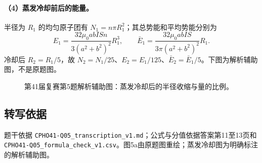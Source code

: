 \paragraph{（4）蒸发冷却前后的能量。}
半径为 $R_1$ 的均匀原子团有 $N_1=n\pi R_1^2$；其总势能和平均势能分别为
\[E_1=\frac{32\mu_0abISn}{3(a^2+b^2)^2}R_1^3,\qquad \bar E_1=\frac{32\mu_0abIS}{3\pi(a^2+b^2)^2}R_1.\]
冷却后 $R_2=R_1/5$，故 $N_2=N_1/25$、$E_2=E_1/125$、$\bar E_2=\bar E_1/5$。下图为解析辅助图，不是原题图。
\begin{figure}[htbp]\centering\caption{第41届复赛第5题解析辅助图：蒸发冷却后的半径收缩与量的比例。}\end{figure}
\subsection{转写依据}
题干依据 \texttt{CPHO41-Q05\_transcription\_v1.md}；公式与分值依据答案第11至13页和 \texttt{CPHO41-Q05\_formula\_check\_v1.csv}。图5a由原题图重绘；蒸发冷却图为明确标注的解析辅助图。
